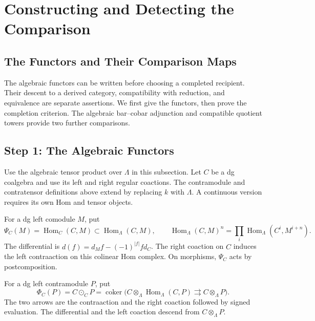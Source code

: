 \section{Constructing and Detecting the Comparison}
\label{v4-arith:pos:main-theorem}

\subsection{The Functors and Their Comparison Maps}
\label{v4-arith:pos:proof-overview}

The algebraic functors can be written before choosing a completed
recipient. Their descent to a derived category, compatibility with
reduction, and equivalence are separate assertions.
We first give the functors, then prove the completion criterion.
The algebraic bar--cobar adjunction and compatible quotient towers
provide two further comparisons.

\subsection{Step 1: The Algebraic Functors}
\label{v4-arith:pos:step-1}

Use the algebraic tensor product over \(\Lambda\) in this
subsection. Let \(C\) be a dg coalgebra and use its left and
right regular coactions. The contramodule and contratensor
definitions above extend by replacing \(k\) with \(\Lambda\).
A continuous version requires its own Hom and tensor objects.

\begin{definition}
\label{v4-arith:pos:def:psi}
For a dg left comodule \(M\), put
\[
 \Psi_C(M)=\operatorname{Hom}_C(C,M)
 \subset\operatorname{Hom}_\Lambda(C,M),
 \qquad
 \operatorname{Hom}_\Lambda(C,M)^n
 =\prod_i\operatorname{Hom}_\Lambda(C^i,M^{i+n}).
\]
The differential is
\(d(f)=d_Mf-(-1)^{|f|}fd_C\).
The right coaction on \(C\) induces the left contraaction on
this colinear Hom complex. On morphisms, \(\Psi_C\) acts by
postcomposition.
\end{definition}

\begin{definition}
\label{v4-arith:pos:def:phi}
For a dg left contramodule \(P\), put
\[
 \Phi_C(P)=C\odot_C P
 =\operatorname{coker}\bigl(
 C\otimes_\Lambda\operatorname{Hom}_\Lambda(C,P)
 \rightrightarrows C\otimes_\Lambda P\bigr).
\]
The two arrows are the contraaction and the right coaction
followed by signed evaluation. The differential and the left
coaction descend from \(C\otimes_\Lambda P\).
\end{definition}

